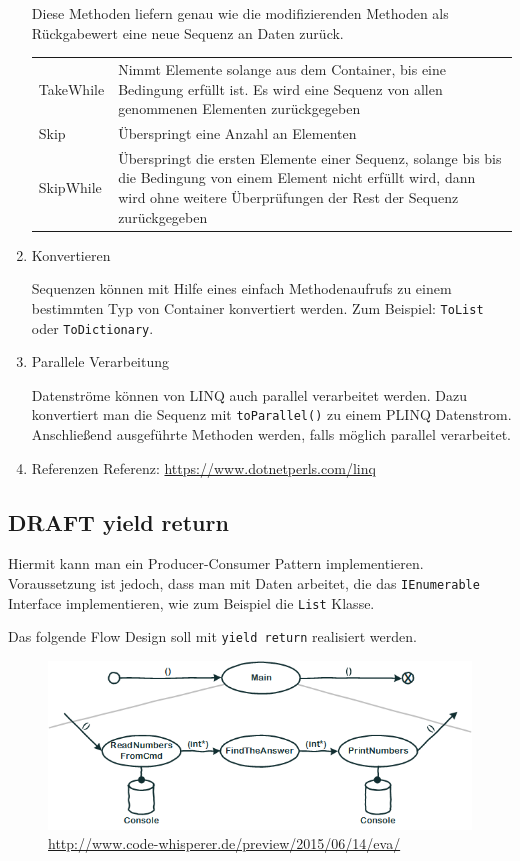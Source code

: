 \documentclass[a4paper,12pt,oneside]{book}
\begin{document}
\begin{enumerate}
\label{sec-4-3-1-5}
Diese Methoden liefern genau wie die modifizierenden Methoden als Rückgabewert
eine neue Sequenz an Daten zurück.
\begin{center}
	\bgroup
	\def\arraystretch{1.5}%
	\begin{tabularx}{\textwidth}{|p{5cm}|X|}
TakeWhile & Nimmt Elemente solange aus dem Container, bis eine Bedingung erfüllt ist. Es wird eine Sequenz von allen genommenen Elementen zurückgegeben\\
Skip & Überspringt eine Anzahl an Elementen\\
SkipWhile & Überspringt die ersten Elemente einer Sequenz, solange bis bis die Bedingung von einem Element nicht erfüllt wird, dann wird ohne weitere Überprüfungen der Rest der Sequenz zurückgegeben\\
\end{tabularx}
\egroup
\end{center}
\item Konvertieren

\label{sec-4-3-1-6}
Sequenzen können mit Hilfe eines einfach Methodenaufrufs zu einem bestimmten Typ
von Container konvertiert werden. Zum Beispiel: \texttt{ToList} oder \texttt{ToDictionary}.

\item Parallele Verarbeitung
\label{sec-4-3-1-7}

Datenströme können von LINQ auch parallel verarbeitet werden. Dazu konvertiert
man die Sequenz mit \texttt{toParallel()} zu einem PLINQ Datenstrom.
Anschließend ausgeführte Methoden werden, falls möglich parallel verarbeitet.

\item Referenzen
\label{sec-4-3-1-8}
Referenz: \url{https://www.dotnetperls.com/linq}
\end{enumerate}

\subsection{DRAFT yield return}
\label{sec-4-3-2}
Hiermit kann man ein Producer-Consumer Pattern implementieren.
Voraussetzung ist jedoch, dass man mit Daten arbeitet, die das \texttt{IEnumerable} Interface implementieren, wie zum Beispiel die
\texttt{List} Klasse.

Das folgende Flow Design soll mit \texttt{yield return} realisiert werden.

\begin{figure}[htb]
\centering
\includegraphics[width=.9\linewidth]{./img/FlowDesign2.png}
\caption{\url{http://www.code-whisperer.de/preview/2015/06/14/eva/}}
\end{figure}
\end{document}
